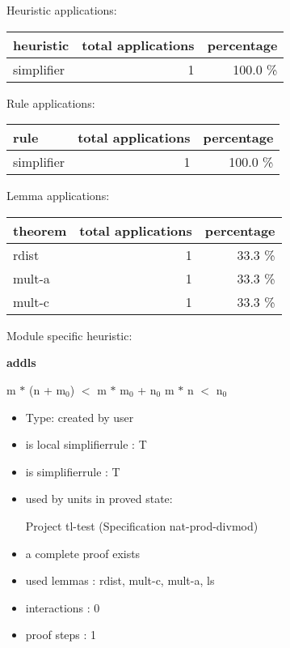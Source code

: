 \documentclass[a4paper]{article}
\begin{document}
\medskip


Heuristic applications:

\begin{supertabular}{l|r|r}
heuristic	& total applications & percentage \\ \hline
simplifier & 1 & 100.0 \% \\

\end{supertabular}

Rule applications:

\begin{supertabular}{l|r|r}
rule	        & total applications & percentage \\ \hline
simplifier & 1 & 100.0 \% \\

\end{supertabular}

Lemma applications:

\begin{supertabular}{l|r|r}
theorem	        & total applications & percentage \\ \hline
rdist & 1 & 33.3 \% \\
mult-a & 1 & 33.3 \% \\
mult-c & 1 & 33.3 \% \\

\end{supertabular}

Module specific heuristic:

\pagebreak

{\LARGE\bf addls}\label{lemma-addls}

\medskip

 \Fol m $*$ (n + $\mbox{m}_{0}$) $<$ m $*$ $\mbox{m}_{0}$ + $\mbox{n}_{0}$ \Equiv m $*$ n $<$ $\mbox{n}_{0}$

\begin{itemize}

\item Type: created by user

\item is local simplifierrule : T
\item is simplifierrule : T
\item used by units in proved state:

Project tl-test (Specification nat-prod-divmod)
\item       a complete proof exists
\item       used lemmas  : rdist, mult-c, mult-a, ls
\item       interactions : 0
\item       proof steps  : 1
\end{itemize}
\end{document}
